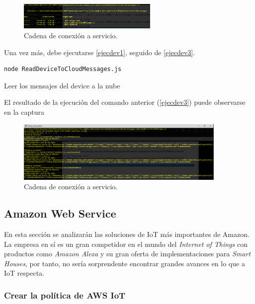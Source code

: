 \documentclass[english,runningheads,a4paper]{llncs}[2018/03/10]
\begin{document}
\begin{figure}[h!]
 \centering
 \includegraphics[width=0.6\textwidth]{./IoT/MicrosoftAzure/5-1_read_telemetry.png}
 \caption{Cadena de conexión a servicio.}
 \label{codestringser}
\end{figure}

Una vez más, debe ejecutarse \hyperref[ejecdev1]{\ref{ejecdev1}}, seguido de
\hyperref[ejecdev3]{\ref{ejecdev3}}.


\begin{listing}[htp]
\centering
    \begin{verbatim}
node ReadDeviceToCloudMessages.js
    \end{verbatim}
\caption{Leer los mensajes del device a la nube}
\label{ejecdev3}
\end{listing}

El resultado de la ejecución del comando anterior
(\hyperref[ejecdev3]{\ref{ejecdev3}}) puede observarse en la captura 

\begin{figure}[h!]
 \centering
 \includegraphics[width=0.9\textwidth]{./IoT/MicrosoftAzure/5-4_read_telemetry.png}
 \caption{Cadena de conexión a servicio.}
 \label{nodeser}
\end{figure}

\subsection*{Amazon Web Service}
En esta sección se analizarán las soluciones de IoT más importantes de Amazon.
La empresa en sí es un gran competidor en el mundo del \textit{Internet of
Things} con productos como \textit{Amazon Alexa} y su gran oferta de
implementaciones para \textit{Smart Houses}, por tanto, no sería sorprendente
encontrar grandes avances en lo que a IoT respecta.  

\subsubsection{Crear la política de AWS IoT}
\end{document}
